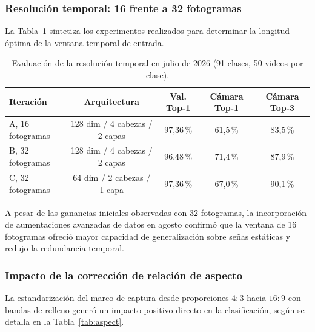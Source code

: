 \subsubsection{Resolución temporal: 16 frente a 32 fotogramas}
La Tabla~\ref{tab:frames_julio} sintetiza los experimentos realizados para determinar la longitud óptima de la ventana temporal de entrada.

\begin{table}[H]
    \centering
    \small
    \caption{Evaluación de la resolución temporal en julio de 2026 (91 clases, 50 videos por clase).}
    \label{tab:frames_julio}
    \begin{tabular}{lcccc}
        \toprule
        \textbf{Iteración} & \textbf{Arquitectura} & \textbf{Val. Top-1} & \textbf{Cámara Top-1} & \textbf{Cámara Top-3} \\
        \midrule
        A, 16 fotogramas & 128 dim / 4 cabezas / 2 capas & 97{,}36\,\% & 61{,}5\,\% & 83{,}5\,\% \\
        B, 32 fotogramas & 128 dim / 4 cabezas / 2 capas & 96{,}48\,\% & 71{,}4\,\% & 87{,}9\,\% \\
        C, 32 fotogramas & 64 dim / 2 cabezas / 1 capa & 97{,}36\,\% & 67{,}0\,\% & 90{,}1\,\% \\
        \bottomrule
    \end{tabular}
\end{table}

A pesar de las ganancias iniciales observadas con 32 fotogramas, la incorporación de aumentaciones avanzadas de datos en agosto confirmó que la ventana de 16 fotogramas ofreció mayor capacidad de generalización sobre señas estáticas y redujo la redundancia temporal.

\subsubsection{Impacto de la corrección de relación de aspecto} %
La estandarización del marco de captura desde proporciones $4:3$ hacia $16:9$ con bandas de relleno generó un impacto positivo directo en la clasificación, según se detalla en la Tabla~\ref{tab:aspect}.

